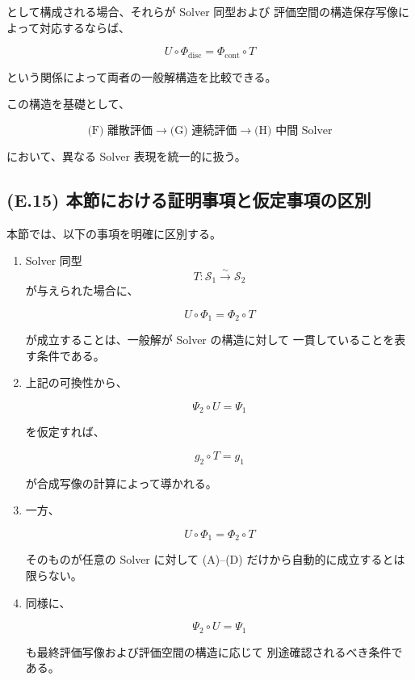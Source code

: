 \documentclass[a4paper,11pt]{article}
\newcommand{\Solver}{\mathcal{S}}
\begin{document}
として構成される場合、それらが Solver 同型および
評価空間の構造保存写像によって対応するならば、

\begin{equation}
    U\circ\Phi_{\mathrm{disc}}
    =
    \Phi_{\mathrm{cont}}\circ T
\end{equation}

という関係によって両者の一般解構造を比較できる。

この構造を基礎として、

\begin{equation}
    \text{(F) 離散評価}
    \longrightarrow
    \text{(G) 連続評価}
    \longrightarrow
    \text{(H) 中間 Solver}
\end{equation}

において、異なる Solver 表現を統一的に扱う。


\subsection{(E.15) 本節における証明事項と仮定事項の区別}
\label{subsec:E15}

本節では、以下の事項を明確に区別する。

\begin{enumerate}

    \item
    Solver 同型
    \[
        T:\Solver_1\overset{\sim}{\longrightarrow}\Solver_2
    \]
    が与えられた場合に、

    \[
        U\circ\Phi_1
        =
        \Phi_2\circ T
    \]

    が成立することは、一般解が Solver の構造に対して
    一貫していることを表す条件である。

    \item
    上記の可換性から、

    \[
        \Psi_2\circ U=\Psi_1
    \]

    を仮定すれば、

    \[
        g_2\circ T=g_1
    \]

    が合成写像の計算によって導かれる。

    \item
    一方、

    \[
        U\circ\Phi_1
        =
        \Phi_2\circ T
    \]

    そのものが任意の Solver に対して
    (A)--(D) だけから自動的に成立するとは限らない。

    \item
    同様に、

    \[
        \Psi_2\circ U=\Psi_1
    \]

    も最終評価写像および評価空間の構造に応じて
    別途確認されるべき条件である。

\end{enumerate}
\end{document}
